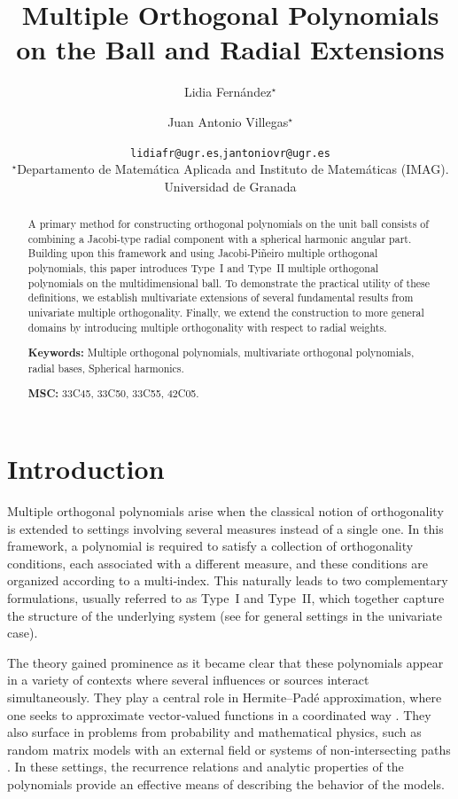 \documentclass[a4paper]{article}
\title{Multiple Orthogonal Polynomials on the Ball and Radial Extensions}
\author{Lidia Fernández$^\star$ \and Juan Antonio Villegas$^\star$}
\date{
    \texttt{lidiafr@ugr.es},\qquad \texttt{jantoniovr@ugr.es}\\[2ex]%
	$^\star$Departamento de Matemática Aplicada and Instituto de Matemáticas (IMAG). Universidad de Granada \\[2ex]%
}
\theoremstyle{plain}
\theoremstyle{definition}
\begin{document}
	\maketitle
	
	\begin{abstract}
    
    A primary method for constructing orthogonal polynomials on the unit ball consists of combining a Jacobi-type radial component with a spherical harmonic angular part. Building upon this framework and using Jacobi-Pi\~neiro multiple orthogonal polynomials, this paper introduces Type~I and Type~II multiple orthogonal polynomials on the multidimensional ball. To demonstrate the practical utility of these definitions, we establish multivariate extensions of several fundamental results from univariate multiple orthogonality. Finally, we extend the construction to more general domains by introducing multiple orthogonality with respect to radial weights.
		
		\noindent\textbf{Keywords:} Multiple orthogonal polynomials, multivariate orthogonal polynomials, radial bases, Spherical harmonics.

        \noindent\textbf{MSC: } 33C45, 33C50, 33C55, 42C05.
	\end{abstract}


   	
\section{Introduction}\label{sec:intro}

Multiple orthogonal polynomials arise when the classical notion of orthogonality is extended to settings involving several measures instead of a single one. In this framework, a polynomial is required to satisfy a collection of orthogonality conditions, each associated with a different measure, and these conditions are organized according to a multi‑index. This naturally leads to two complementary formulations, usually referred to as Type~I and Type~II, which together capture the structure of the underlying system (see \cite{Ism05, MFVA16, VA20} for general settings in the univariate case). \medskip

The theory gained prominence as it became clear that these polynomials appear in a variety of contexts where several influences or sources interact simultaneously. They play a central role in Hermite–Padé approximation, where one seeks to approximate vector‑valued functions in a coordinated way \cite{VA06}. They also surface in problems from probability and mathematical physics, such as random matrix models with an external field or systems of non-intersecting paths \cite{BK04, DK07}. In these settings, the recurrence relations and analytic properties of the polynomials provide an effective means of describing the behavior of the models. \medskip
\end{document}
